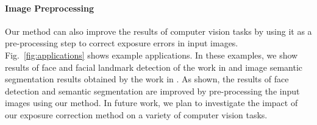 \documentclass[final]{cvpr}
\begin{document}
\paragraph{Image Preprocessing}
Our method can also improve the results of computer vision tasks by using it as a pre-processing step to correct exposure errors in input images. Fig.\ \ref{fig:applications} shows example applications. In these examples, we show results of face and facial landmark detection of the work in \cite{zhang2016joint} and image semantic segmentation results obtained by the work in \cite{Lin:2017:RefineNet, lin2019refinenet}. As shown, the results of face detection and semantic segmentation are improved by pre-processing the input images using our method. In future work, we plan to investigate the impact of our exposure correction method on a variety of computer vision tasks.
\end{document}

